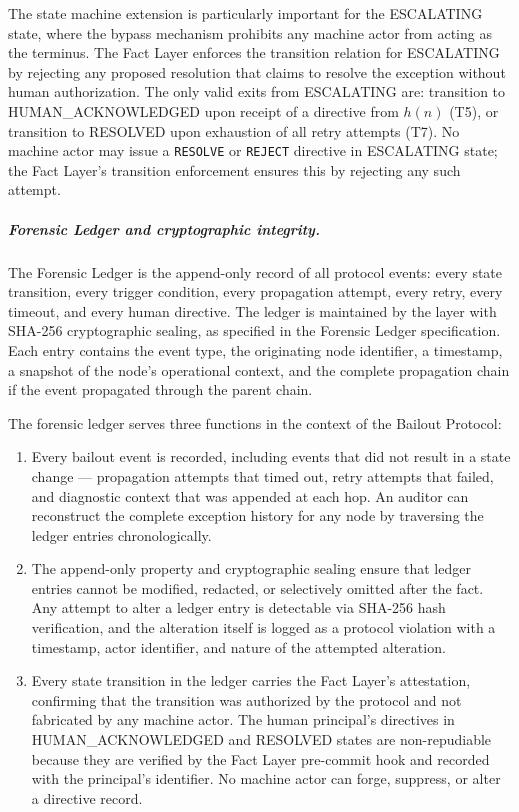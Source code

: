 The state machine extension is particularly important for the ESCALATING state, where the bypass mechanism prohibits any machine actor from acting as the terminus. The Fact Layer enforces the transition relation for ESCALATING by rejecting any proposed resolution that claims to resolve the exception without human authorization. The only valid exits from ESCALATING are: transition to HUMAN\_ACKNOWLEDGED upon receipt of a directive from $h(n)$ (T5), or transition to RESOLVED upon exhaustion of all retry attempts (T7). No machine actor may issue a \texttt{RESOLVE} or \texttt{REJECT} directive in ESCALATING state; the Fact Layer's transition enforcement ensures this by rejecting any such attempt.

\subparagraph{Forensic Ledger and cryptographic integrity.} The Forensic Ledger is the append-only record of all protocol events: every state transition, every trigger condition, every propagation attempt, every retry, every timeout, and every human directive. The ledger is maintained by the \fact{} layer with SHA-256 cryptographic sealing, as specified in the \bxthree{} Forensic Ledger specification. Each entry contains the event type, the originating node identifier, a timestamp, a snapshot of the node's operational context, and the complete propagation chain if the event propagated through the parent chain.

The forensic ledger serves three functions in the context of the Bailout Protocol:

\begin{enumerate}
\item[(\emph{Completeness})] Every bailout event is recorded, including events that did not result in a state change — propagation attempts that timed out, retry attempts that failed, and diagnostic context that was appended at each hop. An auditor can reconstruct the complete exception history for any node by traversing the ledger entries chronologically.

\item[(\emph{Integrity})] The append-only property and cryptographic sealing ensure that ledger entries cannot be modified, redacted, or selectively omitted after the fact. Any attempt to alter a ledger entry is detectable via SHA-256 hash verification, and the alteration itself is logged as a protocol violation with a timestamp, actor identifier, and nature of the attempted alteration.

\item[(\emph{Non-repudiation})] Every state transition in the ledger carries the Fact Layer's attestation, confirming that the transition was authorized by the protocol and not fabricated by any machine actor. The human principal's directives in HUMAN\_ACKNOWLEDGED and RESOLVED states are non-repudiable because they are verified by the Fact Layer pre-commit hook and recorded with the principal's identifier. No machine actor can forge, suppress, or alter a directive record.
\end{enumerate}

